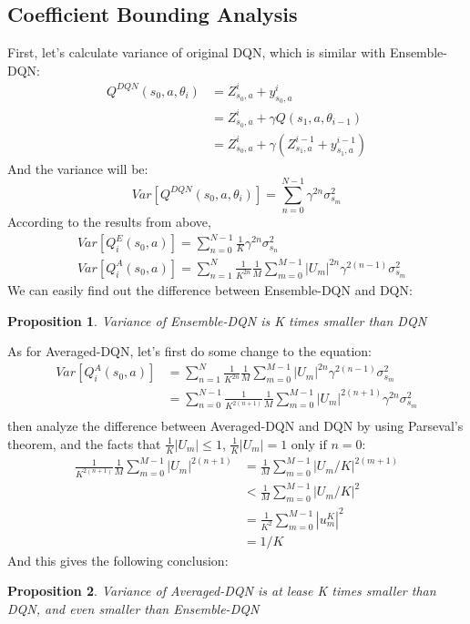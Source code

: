 \subsection{Coefficient Bounding Analysis}
First, let's calculate variance of original DQN, which is similar with Ensemble-DQN:
\[
\begin{aligned}
Q^{DQN}(s_{0},a,\theta_{i}) &=Z^i_{s_{0},a}+y^i_{s_{0},a}\\
                            &=Z^i_{s_{0},a}+\gamma Q(s_{1},a,\theta_{i-1})\\
                            &=Z^i_{s_{0},a}+\gamma(Z^{i-1}_{s_{1},a}+y^{i-1}_{s_{1},a})
\end{aligned}
\]
And the variance will be:
\[
Var[Q^{DQN}(s_{0},a,\theta_{i})]=\sum^{N-1}_{n=0}\gamma^{2n}\sigma^2_{s_{m}}
\]
According to the results from above, 
\[
\begin{aligned}
&Var[Q^E_{i}(s_{0},a)]=\sum^{N-1}_{n=0}\frac{1}{K}\gamma ^{2n}\sigma^2_{s_n}\\
&Var[Q^A_{i}(s_{0},a)]=\sum^N_{n=1}\frac{1}{K^{2n}}\frac{1}{M}\sum^{M-1}_{m=0}|U_{m}|^{2n}\gamma^{2(n-1)}\sigma^2_{s_{m}}
\end{aligned}
\]
We can easily find out the difference between Ensemble-DQN and DQN:
\newtheorem{prop1}{Proposition}
\begin{prop1}
Variance of Ensemble-DQN is K times smaller than DQN
\end{prop1}
As for Averaged-DQN, let's first do some change to the equation:
\[
\begin{aligned}
Var[Q^A_{i}(s_{0},a)]   &=\sum^N_{n=1}\frac{1}{K^{2n}}\frac{1}{M}\sum^{M-1}_{m=0}|U_{m}|^{2n}\gamma^{2(n-1)}\sigma^2_{s_{m}}\\
                        &=\sum^{N-1}_{n=0}\frac{1}{K^{2(n+1)}}\frac{1}{M}\sum^{M-1}_{m=0}|U_{m}|^{2(n+1)}\gamma^{2n}\sigma^2_{s_{m}}\\
\end{aligned}
\]
then analyze the difference between Averaged-DQN and DQN by using Parseval’s theorem, and the facts that \begin{math}\frac{1}{K}|U_{m}|\leq 1\end{math}, \begin{math}\frac{1}{K}|U_{m}|=1 \text{ only if } n=0\end{math}:
\[
\begin{aligned}
\frac{1}{K^{2(n+1)}}\frac{1}{M}\sum^{M-1}_{m=0}|U_{m}|^{2(n+1)}&=\frac{1}{M}\sum^{M-1}_{m=0}|U_{m}/K|^{2(m+1)}\\
&<\frac{1}{M}\sum^{M-1}_{m=0}|U_{m}/K|^{2}\\
&=\frac{1}{K^2}\sum^{M-1}_{m=0}|u^K_{m}|^2\\
&=1/K
\end{aligned}
\]
And this gives the following conclusion:
\newtheorem{prop2}[prop1]{Proposition}
\begin{prop2}
Variance of Averaged-DQN is at lease K times smaller than DQN, and even smaller than Ensemble-DQN
\end{prop2}

\iffalse
Please present the theoretical analysis in this section. Moreover, please formally state the major theoretical results using theorem/proposition/corollary/lemma environments. Also, please clearly highlight your new proofs or extensions (if any).
\fi

